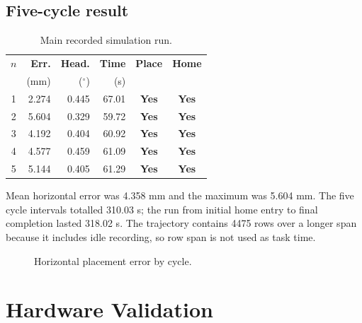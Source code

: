 \documentclass[9pt,a4paper,twocolumn,twoside]{tau-class/tau}
\newcommand{\yes}{\textcolor{resultgreen}{\textbf{Yes}}}
\begin{document}
\subsection{Five-cycle result}
\begin{table}[H]
\caption{Main recorded simulation run.}
\label{tab:simresult}
\centering
\begin{tabular}{@{}crrrcc@{}}
\toprule
$n$ & \textbf{Err.} & \textbf{Head.} & \textbf{Time} & \textbf{Place} & \textbf{Home}\\
 & (mm) & ($^\circ$) & (s) & & \\
\midrule
1 & 2.274 & 0.445 & 67.01 & \yes & \yes\\
2 & 5.604 & 0.329 & 59.72 & \yes & \yes\\
3 & 4.192 & 0.404 & 60.92 & \yes & \yes\\
4 & 4.577 & 0.459 & 61.09 & \yes & \yes\\
5 & 5.144 & 0.405 & 61.29 & \yes & \yes\\
\bottomrule
\end{tabular}
\end{table}

Mean horizontal error was 4.358 mm and the maximum was 5.604 mm. The five cycle
intervals totalled 310.03 s; the run from initial home entry to final completion
lasted 318.02 s. The trajectory contains 4475 rows over a longer span because it
includes idle recording, so row span is not used as task time.

\begin{figure}[H]
\centering
{}
\caption{Horizontal placement error by cycle.}
\label{fig:error}
\end{figure}

\section{Hardware Validation}
\end{document}
